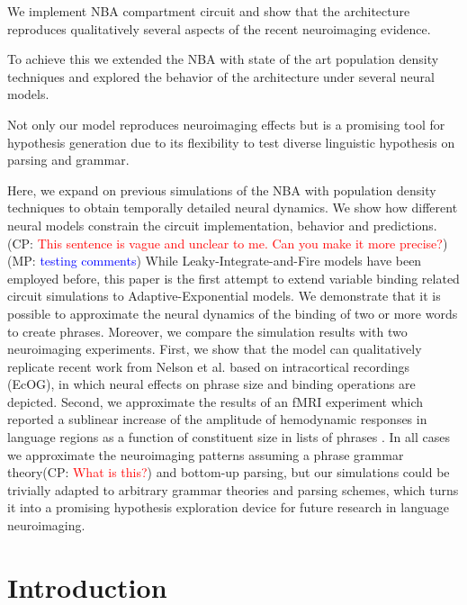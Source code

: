 \documentclass[10pt]{article}
\newcommand{\noteCP}[1]{(CP: \textcolor{red}{#1})}
\newcommand{\noteMP}[2]{(MP: \textcolor{blue}{#1})}
\begin{document}
We implement NBA compartment circuit and show that the architecture reproduces qualitatively several aspects of the recent neuroimaging evidence.

To achieve this we extended the NBA with state of the art population density techniques and explored the behavior of the architecture under several neural models.

Not only our model reproduces neuroimaging effects but is a promising tool for hypothesis generation due to its flexibility to test diverse linguistic hypothesis on parsing and grammar.

Here, we expand on previous simulations of the NBA with population density techniques to obtain temporally detailed neural dynamics.
We show how different neural models constrain the circuit
implementation, behavior and predictions.\noteCP{This sentence is
vague and unclear to me. Can you make it more precise?}
\noteMP{testing comments}. While
Leaky-Integrate-and-Fire models have been employed before, this paper
is the first attempt to extend variable binding related circuit
simulations to Adaptive-Exponential models. We demonstrate that it is
possible to approximate the neural dynamics of the binding of two or
more words to create phrases. Moreover, we compare the simulation
results with two neuroimaging experiments. First, we show that the
model can qualitatively replicate recent work from Nelson et al.
\cite{Nelson_2017} based on intracortical recordings (EcOG), in which
neural effects on phrase size and binding operations are depicted.
Second, we approximate the results of an fMRI experiment which
reported a sublinear increase of the amplitude of hemodynamic
responses in language regions as a function of constituent size in
lists of phrases \cite{Pallier_2011}. In all cases we approximate the
neuroimaging patterns assuming a phrase grammar theory\noteCP{What is this?} and bottom-up
parsing, but our simulations could be trivially adapted to arbitrary
grammar theories and parsing schemes, which turns it into a promising
hypothesis exploration device for future research in language
neuroimaging.

\section{Introduction}

{\label{931947}}
\end{document}
